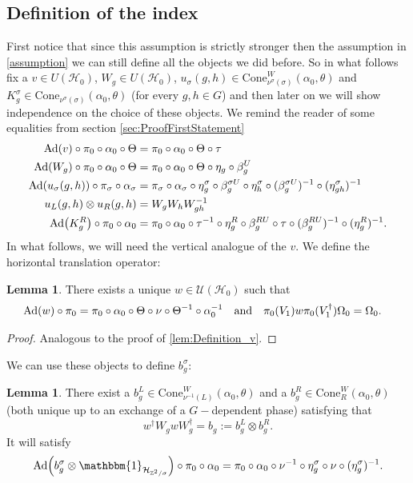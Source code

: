 \documentclass[12pt,a4paper,twoside]{article}
\let\originalleft\left
\let\originalright\right
\renewcommand{\left}{\mathopen{}\mathclose\bgroup\originalleft}
\renewcommand{\right}{\aftergroup\egroup\originalright}
\newcommand{\UU}{\mathcal U}
\newcommand{\HH}{\mathcal H}
\newcommand{\ZZ}{\mathbb Z}
\newcommand{\id}{\mathbbm{1}}
\newcommand{\Ad}[1]{\textrm{Ad}\left(#1\right)}
\theoremstyle{definition}
\newtheorem{lemma}[theorem]{Lemma}
\numberwithin{equation}{section}
\begin{document}
\subsection{Definition of the index}
 First notice that since this assumption is strictly stronger then the assumption in \ref{assumption} we can still define all the objects we did before. So in what follows fix a $v\in U(\HH_0)$, $W_g\in U(\HH_0)$, $u_\sigma(g,h)\in \textrm{Cone}_{\nu^\sigma(\sigma)}^W(\alpha_0,\theta)$ and $K_g^\sigma\in\textrm{Cone}_{\nu^\sigma(\sigma)}(\alpha_0,\theta)$ (for every $g,h\in G$) and then later on we will show independence on the choice of these objects. We remind the reader of some equalities from section \ref{sec:ProofFirstStatement}
\begin{align}
		\Ad{v}\circ\pi_0\circ\alpha_0\circ\Theta&=\pi_0\circ\alpha_0\circ\Theta\circ\tau\\
		\Ad{W_g}\circ\pi_0\circ\alpha_0\circ\Theta&=\pi_0\circ\alpha_0\circ\Theta\circ\eta_g\circ\beta_g^U\\
		\Ad{u_\sigma(g,h)}\circ\pi_\sigma\circ\alpha_\sigma&=\pi_\sigma\circ\alpha_\sigma\circ\eta_g^\sigma\circ\beta_g^{\sigma U}\circ\eta_h^{\sigma}\circ(\beta_g^{\sigma U})^{-1}\circ(\eta^\sigma_{gh})^{-1}\\
		u_L(g,h)\otimes u_R(g,h)&=W_gW_hW_{gh}^{-1}\\
		\Ad{K^R_g}\circ\pi_0\circ\alpha_0&=\pi_0\circ \alpha_0\circ \tau^{-1}\circ \eta_g^R\circ\beta_g^{RU}\circ\tau\circ(\beta_g^{RU})^{-1}\circ(\eta_g^{R})^{-1}.
	\end{align}
In what follows, we will need the vertical analogue of the $v$. We define the horizontal translation operator:
\begin{lemma}\label{lem:Definition_w}
	There exists a unique $w\in\UU(\HH_0)$ such that
	\begin{align}
		\Ad{w}\circ\pi_0&=\pi_0\circ\alpha_0\circ\Theta\circ\nu\circ\Theta^{-1}\circ\alpha_0^{-1}&&\text{and}&\pi_0(V_1)w\pi_0(V_1^\dagger)\Omega_0&=\Omega_0.
	\end{align}
\end{lemma}
\begin{proof}
	Analogous to the proof of \ref{lem:Definition_v}.
\end{proof}
 We can use these objects to define $b^\sigma_g$:
\begin{lemma}
	There exist a $b_g^L\in\textrm{Cone}_{\nu^{-1}(L)}^W(\alpha_0,\theta)$ and a $b_g^R\in\textrm{Cone}_{R}^W(\alpha_0,\theta)$ (both unique up to an exchange of a $G-$dependent phase) satisfying that
	\begin{equation}
		w^\dagger W_g w W_g^\dagger=b_g:=b_g^L\otimes b_g^R.
	\end{equation}
	It will satisfy
	\begin{equation}\label{eq:automorphismBelongingTo_b}
		\Ad{b_g^\sigma\otimes\id_{\HH_{\ZZ^2/\sigma}}}\circ\pi_0\circ\alpha_0=\pi_0\circ\alpha_0\circ\nu^{-1}\circ\eta_g^\sigma\circ\nu\circ(\eta_g^\sigma)^{-1}.
	\end{equation}
\end{lemma}
\end{document}
